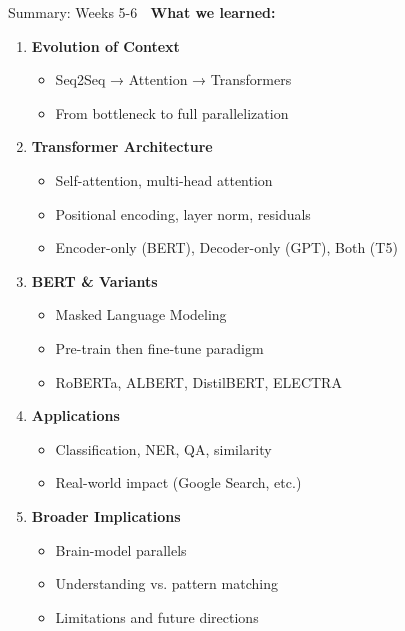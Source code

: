 \documentclass[aspectratio=169]{beamer}
\begin{document}
\begin{frame}[shrink=10]{Summary: Weeks 5-6 🎯}
\textbf{What we learned:}

\vspace{1em}

\begin{enumerate}\setlength{\itemsep}{0pt}
    \item \textbf{Evolution of Context}
    \begin{itemize}\setlength{\itemsep}{0pt}
        \item Seq2Seq → Attention → Transformers
        \item From bottleneck to full parallelization
    \end{itemize}

    \item \textbf{Transformer Architecture}
    \begin{itemize}\setlength{\itemsep}{0pt}
        \item Self-attention, multi-head attention
        \item Positional encoding, layer norm, residuals
        \item Encoder-only (BERT), Decoder-only (GPT), Both (T5)
    \end{itemize}

    \item \textbf{BERT \& Variants}
    \begin{itemize}\setlength{\itemsep}{0pt}
        \item Masked Language Modeling
        \item Pre-train then fine-tune paradigm
        \item RoBERTa, ALBERT, DistilBERT, ELECTRA
    \end{itemize}

    \item \textbf{Applications}
    \begin{itemize}\setlength{\itemsep}{0pt}
        \item Classification, NER, QA, similarity
        \item Real-world impact (Google Search, etc.)
    \end{itemize}

    \item \textbf{Broader Implications}
    \begin{itemize}\setlength{\itemsep}{0pt}
        \item Brain-model parallels
        \item Understanding vs. pattern matching
        \item Limitations and future directions
    \end{itemize}
\end{enumerate}
\end{frame}
\end{document}
